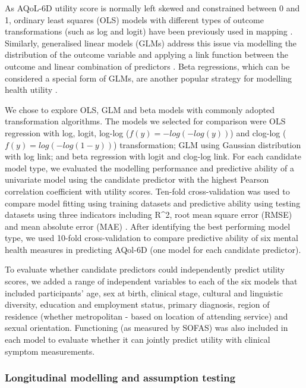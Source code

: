 \documentclass[
  journal=largetwo,
  manuscript=original-article,
  year=2023-Submission,
]{cup-journal}
\begin{document}
As AQoL-6D utility score is normally left skewed and constrained between 0 and 1, ordinary least squares (OLS) models with different types of outcome transformations (such as log and logit) have been previously used in mapping \autocite{RN7}. Similarly, generalised linear models (GLMs) address this issue via modelling the distribution of the outcome variable and applying a link function between the outcome and linear combination of predictors \autocite{Dobson_2018}. Beta regressions, which can be considered a special form of GLMs, are another popular strategy for modelling health utility \autocite{Hunger2011}.

We chose to explore OLS, GLM and beta models with commonly adopted transformation algorithms. The models we selected for comparison were OLS regression with log, logit, log-log (\(f(y) = -log(-log(y))\)) and clog-log (\(f(y) = log(-log(1-y))\)) transformation; GLM using Gaussian distribution with log link; and beta regression with logit and clog-log link. For each candidate model type, we evaluated the modelling performance and predictive ability of a univariate model using the candidate predictor with the highest Pearson correlation coefficient with utility scores. Ten-fold cross-validation was used to compare model fitting using training datasets and predictive ability using testing datasets using three indicators including R\^{}2, root mean square error (RMSE) and mean absolute error (MAE) \autocite{RN20,RN19}. After identifying the best performing model type, we used 10-fold cross-validation to compare predictive ability of six mental health measures in predicting AQol-6D (one model for each candidate predictor).

To evaluate whether candidate predictors could independently predict utility scores, we added a range of independent variables to each of the six models that included participants' age, sex at birth, clinical stage, cultural and linguistic diversity, education and employment status, primary diagnosis, region of residence (whether metropolitan - based on location of attending service) and sexual orientation. Functioning (as measured by SOFAS) was also included in each model to evaluate whether it can jointly predict utility with clinical symptom measurements.

\subsubsection{Longitudinal modelling and assumption testing}
\end{document}
